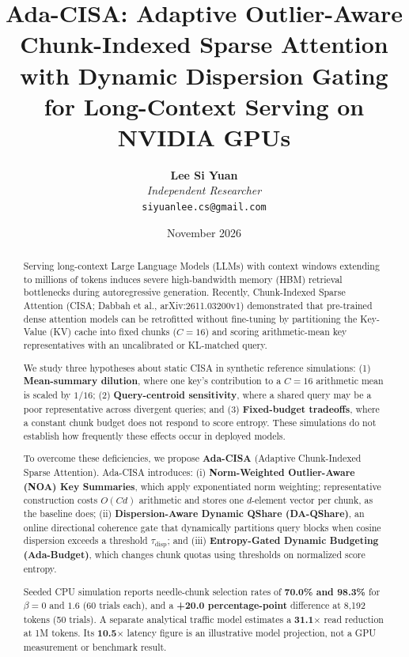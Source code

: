 \documentclass[10pt,twocolumn]{article}
\title{\textbf{Ada-CISA: Adaptive Outlier-Aware Chunk-Indexed Sparse Attention with Dynamic Dispersion Gating for Long-Context Serving on NVIDIA GPUs}}
\author{
    \textbf{Lee Si Yuan} \\
    \textit{Independent Researcher} \\
    \texttt{siyuanlee.cs@gmail.com}
}
\date{November 2026}
\begin{document}
\maketitle

\begin{abstract}
Serving long-context Large Language Models (LLMs) with context windows extending to millions of tokens induces severe high-bandwidth memory (HBM) retrieval bottlenecks during autoregressive generation. Recently, Chunk-Indexed Sparse Attention (CISA; Dabbah et al., arXiv:2611.03200v1) demonstrated that pre-trained dense attention models can be retrofitted without fine-tuning by partitioning the Key-Value (KV) cache into fixed chunks ($C=16$) and scoring arithmetic-mean key representatives with an uncalibrated or KL-matched query.

We study three hypotheses about static CISA in synthetic reference simulations: (1) \textbf{Mean-summary dilution}, where one key's contribution to a $C=16$ arithmetic mean is scaled by $1/16$; (2) \textbf{Query-centroid sensitivity}, where a shared query may be a poor representative across divergent queries; and (3) \textbf{Fixed-budget tradeoffs}, where a constant chunk budget does not respond to score entropy. These simulations do not establish how frequently these effects occur in deployed models.

To overcome these deficiencies, we propose \textbf{Ada-CISA} (Adaptive Chunk-Indexed Sparse Attention). Ada-CISA introduces: (i) \textbf{Norm-Weighted Outlier-Aware (NOA) Key Summaries}, which apply exponentiated norm weighting; representative construction costs $O(Cd)$ arithmetic and stores one $d$-element vector per chunk, as the baseline does; (ii) \textbf{Dispersion-Aware Dynamic QShare (DA-QShare)}, an online directional coherence gate that dynamically partitions query blocks when cosine dispersion exceeds a threshold $\tau_{\text{disp}}$; and (iii) \textbf{Entropy-Gated Dynamic Budgeting (Ada-Budget)}, which changes chunk quotas using thresholds on normalized score entropy.

Seeded CPU simulation reports needle-chunk selection rates of \textbf{70.0\% and 98.3\%} for $\beta=0$ and $1.6$ (60 trials each), and a \textbf{+20.0 percentage-point} difference at 8,192 tokens (50 trials). A separate analytical traffic model estimates a \textbf{31.1$\times$} read reduction at 1M tokens. Its \textbf{10.5$\times$} latency figure is an illustrative model projection, not a GPU measurement or benchmark result.
\end{abstract}
\end{document}
